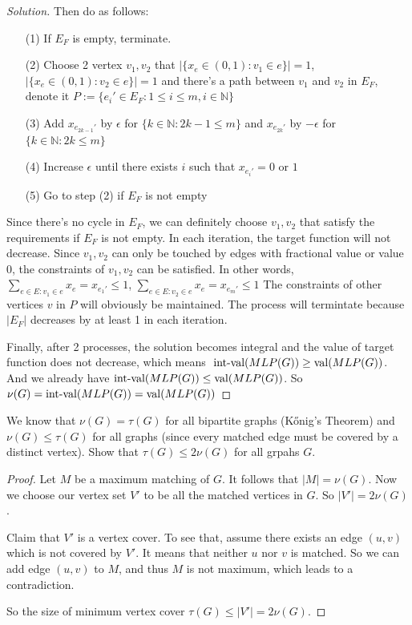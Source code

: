 \begin{proof}[Solution]
        Then do as follows:
        \begin{itemize}
            \item[(1)] If $E_F$ is empty, terminate.
            \item[(2)] Choose 2 vertex $v_1,v_2$ that $|\{x_e\in(0,1):v_1\in e\}|=1$, $|\{x_e\in(0,1):v_2\in e\}|=1$ and there's a path between $v_1$ and $v_2$ in $E_F$, denote it $P:=\{e_{i}'\in E_F:1\le i \le m,i\in\mathbb{N}\}$
            \item[(3)] Add $x_{e_{2k-1}'}$ by $\epsilon$ for $\{k\in\mathbb{N}:2k-1\le m\}$ and $x_{e_{2k}'}$ by $-\epsilon$ for $\{k\in\mathbb{N}:2k\le m\}$
            \item[(4)] Increase $\epsilon$ until there exists $i$ such that $x_{e_{i}'}=0 \text{ or } 1$
            \item[(5)] Go to step (2) if $E_F$ is not empty
        \end{itemize}
        Since there's no cycle in $E_F$, we can definitely choose $v_1,v_2$ that satisfy the requirements if $E_F$ is not empty.
        In each iteration, the target function will not decrease.
        Since $v_1,v_2$ can only be touched by edges with fractional value or value 0, the constraints of $v_1,v_2$ can be satisfied.
        In other words, $\sum_{e\in E:v_1\in e}x_e =x_{e_{1}'} \le 1$, $\sum_{e\in E:v_2\in e}x_e =x_{e_{m}'} \le 1$
        The constraints of other vertices $v$ in $P$ will obviously be maintained.
        The process will termintate because $|E_F|$ decreases by at least 1 in each iteration.

        Finally, after 2 processes, the solution becomes integral and the value of target function does not decrease, which means $\text{ int-val}(MLP(G))\ge {\rm val}(MLP(G))$.
        And we already have  $\text{int-val}(MLP(G))\le {\rm val}(MLP(G))$.
        So $\nu(G)=\text{int-val}(MLP(G))= {\rm val}(MLP(G))$
    \end{proof}

    \newpage

    \begin{thm}{}{}
        We know that $\nu(G) = \tau(G)$ for all bipartite graphs (K\H{o}nig's Theorem) and $\nu(G) \leq \tau(G)$ for all graphs (since every matched edge must be covered by a distinct vertex). Show that $\tau(G) \leq 2\nu(G)$ for all grpahs $G$.
    \end{thm}

    \begin{proof}
        Let $M$ be a maximum matching of $G$. It follows that $|M| = \nu(G)$. Now we choose our vertex set $V'$ to be all the matched vertices in $G$. So $|V'| = 2\nu(G)$. 
        
        Claim that $V'$ is a vertex cover. To see that, assume there exists an edge $(u, v)$ which is not covered by $V'$. It means that neither $u$ nor $v$ is matched. So we can add edge $(u, v)$ to $M$, and thus $M$ is not maximum, which leads to a contradiction.
        
        So the size of minimum vertex cover $\tau(G) \leq |V'| = 2\nu(G)$.
    \end{proof}


